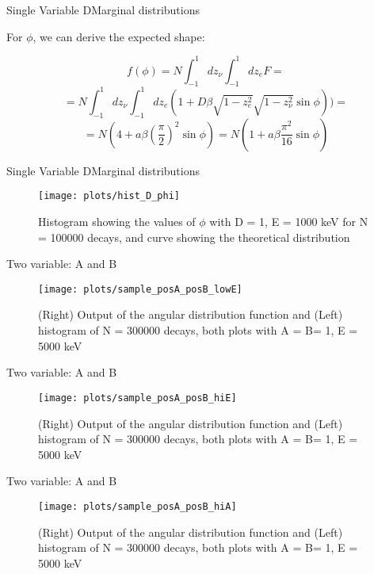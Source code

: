 \documentclass{beamer}
\begin{document}
\begin{frame}{Single Variable D}{Marginal distributions}
	
	
	For $\phi$, we can derive the expected shape: 
	
	$$f(\phi) = N\int_{-1}^{1}dz_\nu\int_{-1}^{1}dz_e F =$$$$= N\int_{-1}^{1}dz_\nu\int_{-1}^{1}dz_e (1 + D\beta\sqrt{1-z^2_e}\sqrt{1-z^2_\nu}\sin \phi)) = $$$$ = N\left(4+a\beta\left(\frac{\pi}{2}\right)^2\sin\phi\right) = N\left(1+a\beta\frac{\pi^2}{16}\sin\phi\right)  $$
	
	
\end{frame}
\begin{frame}{Single Variable D}{Marginal distributions}
	\begin{figure}
		\centering
		\texttt{[image: plots/hist\_D\_phi]}
		\caption{Histogram showing the values of $\phi$ with D = 1, E = 1000 keV for N = 100000 decays, and curve showing the theoretical distribution}
	\end{figure}
\end{frame}

\begin{frame}{Two variable: A and B}
	\begin{figure}
		\centering
		\texttt{[image: plots/sample\_posA\_posB\_lowE]}
		\caption{(Right) Output of the angular distribution function and (Left) histogram of N = 300000 decays, both plots with A = B= 1, E = 5000 keV}
	\end{figure}
\end{frame}

\begin{frame}{Two variable: A and B}
	\begin{figure}
		\centering
		\texttt{[image: plots/sample\_posA\_posB\_hiE]}
		\caption{(Right) Output of the angular distribution function and (Left) histogram of N = 300000 decays, both plots with A = B= 1, E = 5000 keV}
	\end{figure}
\end{frame}

\begin{frame}{Two variable: A and B}
	\begin{figure}
		\centering
		\texttt{[image: plots/sample\_posA\_posB\_hiA]}
		\caption{(Right) Output of the angular distribution function and (Left) histogram of N = 300000 decays, both plots with A = B= 1, E = 5000 keV}
	\end{figure}
\end{frame}
\end{document}
